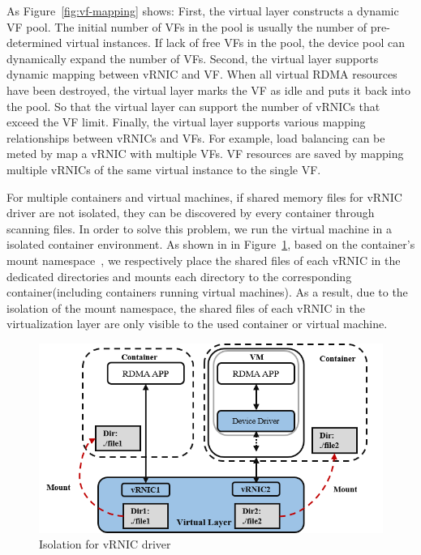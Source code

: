 As Figure~\ref{fig:vf-mapping} shows: First, the virtual layer constructs a dynamic VF pool. The initial number of VFs in the pool is usually the number of pre-determined virtual instances. If lack of free VFs in the pool, the device pool can dynamically expand the number of VFs. Second, the virtual layer supports dynamic mapping between vRNIC and VF. When all virtual RDMA resources have been destroyed, the virtual layer marks the VF as idle and puts it back into the pool. So that the virtual layer can support the number of vRNICs that exceed the VF limit. Finally, the virtual layer supports various mapping relationships between vRNICs and VFs. For example, load balancing can be meted by map a vRNIC with multiple VFs. VF resources are saved by mapping multiple vRNICs of the same virtual instance to the single VF. 

For multiple containers and virtual machines, if shared memory files for vRNIC driver are not isolated, they can be discovered by every container through scanning files. In order to solve this problem, we run the virtual machine in a isolated container environment. As shown in in Figure~\ref{fig:interface-isolate}, based on the container's mount namespace~\cite{mount-ns}, we respectively place the shared files of each vRNIC in the dedicated directories and mounts each directory to the corresponding container(including containers running virtual machines). As a result, due to the isolation of the mount namespace, the shared files of each vRNIC in the virtualization layer are only visible to the used container or virtual machine.  

\begin{figure}[!ht]
	\centering
	\includegraphics[width=1.0\linewidth]{images/interface-isolate}
	\caption{Isolation for vRNIC driver}
	\label{fig:interface-isolate}
\end{figure}

